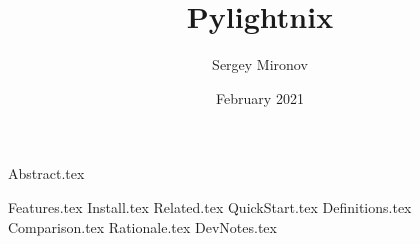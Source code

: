 




\title{Pylightnix}
\author{Sergey Mironov}
\date{February 2021}
\maketitle

{Abstract.tex}

{Features.tex}
{Install.tex}
{Related.tex}
{QuickStart.tex}
{Definitions.tex}
{Comparison.tex}
{Rationale.tex}
{DevNotes.tex}



